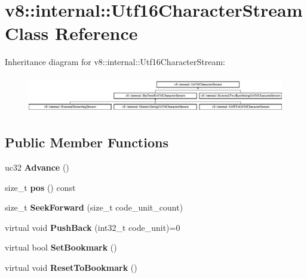 \hypertarget{classv8_1_1internal_1_1_utf16_character_stream}{}\section{v8\+:\+:internal\+:\+:Utf16\+Character\+Stream Class Reference}
\label{classv8_1_1internal_1_1_utf16_character_stream}
Inheritance diagram for v8\+:\+:internal\+:\+:Utf16\+Character\+Stream\+:\begin{figure}[H]
\begin{center}
\leavevmode
\includegraphics[height=1.647059cm]{classv8_1_1internal_1_1_utf16_character_stream}
\end{center}
\end{figure}
\subsection*{Public Member Functions}
\begin{DoxyCompactItemize}
\item 
uc32 {\bfseries Advance} ()\hypertarget{classv8_1_1internal_1_1_utf16_character_stream_a411192b2cf2212fcc3a1167a46906b79}{}\label{classv8_1_1internal_1_1_utf16_character_stream_a411192b2cf2212fcc3a1167a46906b79}

\item 
size\+\_\+t {\bfseries pos} () const \hypertarget{classv8_1_1internal_1_1_utf16_character_stream_ab67a5811cec002098159b845db3f722b}{}\label{classv8_1_1internal_1_1_utf16_character_stream_ab67a5811cec002098159b845db3f722b}

\item 
size\+\_\+t {\bfseries Seek\+Forward} (size\+\_\+t code\+\_\+unit\+\_\+count)\hypertarget{classv8_1_1internal_1_1_utf16_character_stream_a6f89110407d69092e56605dba2e7c09e}{}\label{classv8_1_1internal_1_1_utf16_character_stream_a6f89110407d69092e56605dba2e7c09e}

\item 
virtual void {\bfseries Push\+Back} (int32\+\_\+t code\+\_\+unit)=0\hypertarget{classv8_1_1internal_1_1_utf16_character_stream_a138dd8744238634296b0790a76c645b1}{}\label{classv8_1_1internal_1_1_utf16_character_stream_a138dd8744238634296b0790a76c645b1}

\item 
virtual bool {\bfseries Set\+Bookmark} ()\hypertarget{classv8_1_1internal_1_1_utf16_character_stream_a633a51b6f948ad6c865ac0139ff38dc3}{}\label{classv8_1_1internal_1_1_utf16_character_stream_a633a51b6f948ad6c865ac0139ff38dc3}

\item 
virtual void {\bfseries Reset\+To\+Bookmark} ()\hypertarget{classv8_1_1internal_1_1_utf16_character_stream_aaabca1d5f9a6c128e43c28b7814dcef6}{}\label{classv8_1_1internal_1_1_utf16_character_stream_aaabca1d5f9a6c128e43c28b7814dcef6}

\end{DoxyCompactItemize}
